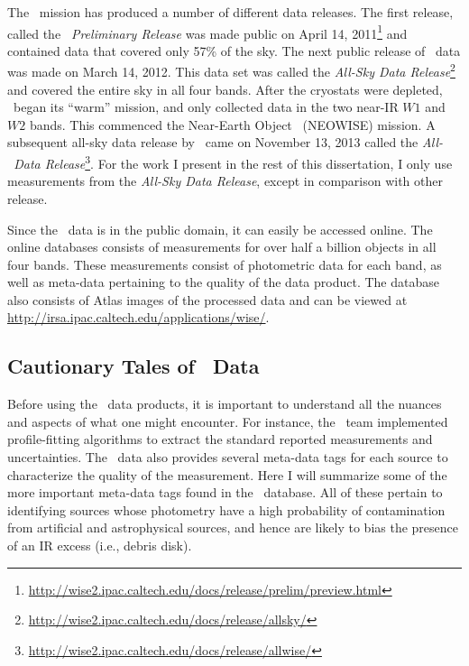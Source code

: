     The \WS\ mission has produced a number of different data releases. The first release, called the \textit{\WS\ Preliminary Release} was made public on April 14, 2011\footnote{\url{http://wise2.ipac.caltech.edu/docs/release/prelim/preview.html}} and contained data that covered only 57\% of the sky. The next public release of \WS\ data was made on March 14, 2012. This data set was called the \textit{All-Sky Data Release}\footnote{\url{http://wise2.ipac.caltech.edu/docs/release/allsky/}} and covered the entire sky in all four bands. After the cryostats were depleted, \WS\ began its ``warm'' mission, and only collected data in the two near-IR $W1$ and $W2$ bands. This commenced the Near-Earth Object \WS\ (NEOWISE) mission. A subsequent all-sky data release by \WS\ came on November 13, 2013 called the \textit{All-\WS\ Data Release}\footnote{\url{http://wise2.ipac.caltech.edu/docs/release/allwise/}}. For the work I present in the rest of this dissertation, I only use measurements from the \textit{All-Sky Data Release}, except in comparison with other release. 
    
    Since the \WS\ data is in the public domain, it can easily be accessed online. The online databases consists of measurements for over half a billion objects in all four bands. These measurements consist of photometric data for each band, as well as meta-data pertaining to the quality of the data product. The database also consists of Atlas images of the processed data and can be viewed at \url{http://irsa.ipac.caltech.edu/applications/wise/}. 
    
    \subsection{Cautionary Tales of \WS\ Data}\label{sec:bad_wise}
    
    Before using the \WS\ data products, it is important to understand all the nuances and aspects of what one might encounter. For instance, the \WS\ team implemented profile-fitting algorithms to extract the standard reported measurements and uncertainties. The \WS\ data also provides several meta-data tags for each source to characterize the quality of the measurement. Here I will summarize some of the more important meta-data tags found in the \WS\ database. All of these pertain to identifying sources whose photometry have a high probability of contamination from artificial and astrophysical sources, and hence are likely to bias the presence of an IR excess (i.e., debris disk).
    
